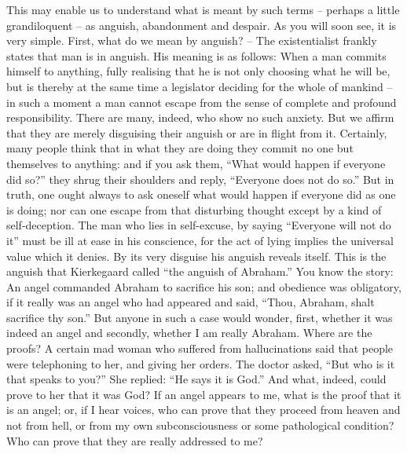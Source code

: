 \documentclass[12pt]{article}
\begin{document}
This may enable us to understand what is meant by such terms – perhaps a little grandiloquent – as anguish, abandonment and despair. As you will soon see, it is very simple. First, what do we mean by anguish? – The existentialist frankly states that man is in anguish. His meaning is as follows: When a man commits himself to anything, fully realising that he is not only choosing what he will be, but is thereby at the same time a legislator deciding for the whole of mankind – in such a moment a man cannot escape from the sense of complete and profound responsibility. There are many, indeed, who show no such anxiety. But we affirm that they are merely disguising their anguish or are in flight from it. Certainly, many people think that in what they are doing they commit no one but themselves to anything: and if you ask them, “What would happen if everyone did so?” they shrug their shoulders and reply, “Everyone does not do so.” But in truth, one ought always to ask oneself what would happen if everyone did as one is doing; nor can one escape from that disturbing thought except by a kind of self-deception. The man who lies in self-excuse, by saying “Everyone will not do it” must be ill at ease in his conscience, for the act of lying implies the universal value which it denies. By its very disguise his anguish reveals itself. This is the anguish that Kierkegaard called “the anguish of Abraham.” You know the story: An angel commanded Abraham to sacrifice his son; and obedience was obligatory, if it really was an angel who had appeared and said, “Thou, Abraham, shalt sacrifice thy son.” But anyone in such a case would wonder, first, whether it was indeed an angel and secondly, whether I am really Abraham. Where are the proofs? A certain mad woman who suffered from hallucinations said that people were telephoning to her, and giving her orders. The doctor asked, “But who is it that speaks to you?” She replied: “He says it is God.” And what, indeed, could prove to her that it was God? If an angel appears to me, what is the proof that it is an angel; or, if I hear voices, who can prove that they proceed from heaven and not from hell, or from my own subconsciousness or some pathological condition? Who can prove that they are really addressed to me?
\end{document}
